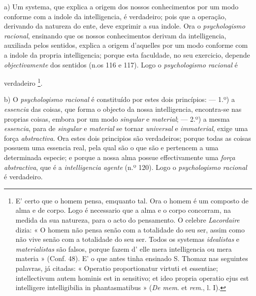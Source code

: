 

a) Um systema, que explica a origem dos nossos conhecimentos por um modo conforme com a indole da intelligencia, é verdadeiro; pois que a operação, derivando da natureza do ente, deve exprimir a sua indole. Ora o \emph{psychologismo racional},   ensinando que os nossos conhecimentos derivam da intelligencia, auxiliada pelos sentidos, explica a origem d'aquelles por um modo conforme com a indole da propria intelligencia; porque esta faculdade, no seu exercicio, depende \emph{objectivamente} dos sentidos (n.os 116 e 117). Logo o \emph{psychologismo racional} é

verdadeiro \footnote{E' certo que o homem pensa, emquanto tal. Ora o homem é um composto de alma e de corpo. Logo é necessario que a alma e o corpo concorram, na medida da sua natureza, para o acto do pensamento. O celebre \emph{Lacordaire} dizia: « O homem não pensa senão com a totalidade do seu ser, assim como não vive senão com a totalidade do seu ser. Todos os systemas \emph{idealistas} e \emph{materialistas} são falsos, porque fazem d' elle mera intelligencia ou mera materia » (Conf. 48). E' o que antes tinha ensinado S. Thomaz nas seguintes palavras, já citadas: « Operatio proportionatur virtuti et essentiae; intellectivum autem hominis est in sensitivo; et ideo propria operatio ejus est intelligere intelligibilia in phantasmatibus » (\emph{De mem}. et \emph{rem}., l. I).}.

b) O \emph{psychologismo racional} é constituído por estes dois princípios: --- 1.º) a \emph{essencia} das coisas, que forma o objecto da nossa intelligencia, encontra-se nas proprias coisas, embora por um modo \emph{singular} e \emph{material}; --- 2.º) a mesma \emph{essencia}, para de \emph{singular} e \emph{material} se tornar \emph{universal} e \emph{immaterial}, exige uma força \emph{abstractiva}. Ora estes dois principios são verdadeiros; porque todas as coisas possuem uma essencia real, pela qual são o que são e pertencem a uma determinada especie; e porque a nossa alma possue effectivamente uma \emph{força abstractiva}, que é a \emph{intelligencia agente} (n.º 120). Logo o \emph{psychologismo racional} é verdadeiro.

